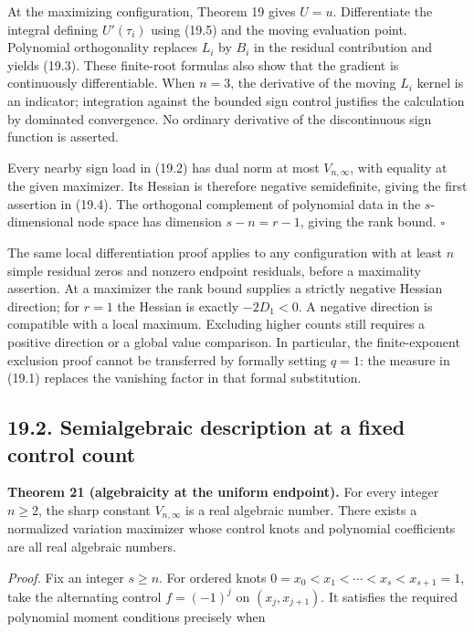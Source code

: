 \documentclass[11pt]{article}
\begin{document}
At the maximizing configuration, Theorem 19 gives \(U=u\). Differentiate
the integral defining \(U'(\tau_i)\) using (19.5) and the moving
evaluation point. Polynomial orthogonality replaces \(L_i\) by \(B_i\)
in the residual contribution and yields (19.3). These finite-root
formulas also show that the gradient is continuously differentiable.
When \(n=3\), the derivative of the moving \(L_i\) kernel is an
indicator; integration against the bounded sign control justifies the
calculation by dominated convergence. No ordinary derivative of the
discontinuous sign function is asserted.

Every nearby sign load in (19.2) has dual norm at most \(V_{n,\infty}\),
with equality at the given maximizer. Its Hessian is therefore negative
semidefinite, giving the first assertion in (19.4). The orthogonal
complement of polynomial data in the \(s\)-dimensional node space has
dimension \(s-n=r-1\), giving the rank bound. \(\square\)

The same local differentiation proof applies to any configuration with
at least \(n\) simple residual zeros and nonzero endpoint residuals,
before a maximality assertion. At a maximizer the rank bound supplies a
strictly negative Hessian direction; for \(r=1\) the Hessian is exactly
\(-2D_1<0\). A negative direction is compatible with a local maximum.
Excluding higher counts still requires a positive direction or a global
value comparison. In particular, the finite-exponent exclusion proof
cannot be transferred by formally setting \(q=1\): the measure in (19.1)
replaces the vanishing factor in that formal substitution.

\subsection{19.2. Semialgebraic description at a fixed control
count}\label{semialgebraic-description-at-a-fixed-control-count}

\textbf{Theorem 21 (algebraicity at the uniform endpoint).} For every
integer \(n\ge2\), the sharp constant \(V_{n,\infty}\) is a real
algebraic number. There exists a normalized variation maximizer whose
control knots and polynomial coefficients are all real algebraic
numbers.

\emph{Proof.} Fix an integer \(s\ge n\). For ordered knots
\(0=x_0<x_1<\cdots<x_s<x_{s+1}=1\), take the alternating control
\(f=(-1)^j\) on \((x_j,x_{j+1})\). It satisfies the required polynomial
moment conditions precisely when
\end{document}
